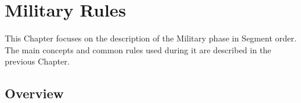 
\chapter{Military Rules}\label{chapter:MilitaryRules}

\begin{designnote}
  This Chapter focuses on the description of the Military phase in
  Segment order. The main concepts and common rules used during it are
  described in the previous Chapter.
\end{designnote}

\section{Overview}
\aparag[Sequence]
\MilitaryDetailsNew

